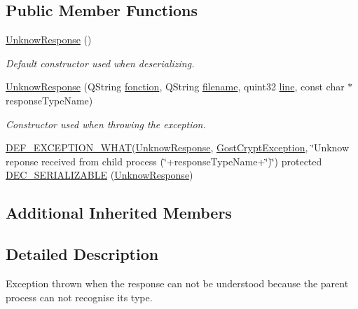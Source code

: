 \subsection*{Public Member Functions}
\begin{DoxyCompactItemize}
\item 
\hyperlink{class_gost_crypt_1_1_core_1_1_unknow_response_a612723cf66cd18947708881e18a1c0ae}{Unknow\+Response} ()
\begin{DoxyCompactList}\small\item\em Default constructor used when deserializing. \end{DoxyCompactList}\item 
\hyperlink{class_gost_crypt_1_1_core_1_1_unknow_response_a1e5f391b0bce671f709a09af6509ff4d}{Unknow\+Response} (Q\+String \hyperlink{class_gost_crypt_1_1_gost_crypt_exception_a29b8c93d5efbb1ff369107385725a939}{fonction}, Q\+String \hyperlink{class_gost_crypt_1_1_gost_crypt_exception_a749a12375f4ba9d502623b99d8252f38}{filename}, quint32 \hyperlink{class_gost_crypt_1_1_gost_crypt_exception_abf506d911f12a4e969eea500f90bd32c}{line}, const char $\ast$response\+Type\+Name)
\begin{DoxyCompactList}\small\item\em Constructor used when throwing the exception. \end{DoxyCompactList}\item 
\hyperlink{_gost_crypt_exception_8h_a5bc1e1c6c9d6f46c84eeba49e33355f9}{D\+E\+F\+\_\+\+E\+X\+C\+E\+P\+T\+I\+O\+N\+\_\+\+W\+H\+AT}(\hyperlink{class_gost_crypt_1_1_core_1_1_unknow_response}{Unknow\+Response}, \hyperlink{class_gost_crypt_1_1_gost_crypt_exception}{Gost\+Crypt\+Exception}, \char`\"{}Unknow reponse received from child process (\char`\"{}+response\+Type\+Name+\char`\"{})\char`\"{}) protected \hyperlink{class_gost_crypt_1_1_core_1_1_unknow_response_a3f17b94045a5ee49f399fe2278fa8742}{D\+E\+C\+\_\+\+S\+E\+R\+I\+A\+L\+I\+Z\+A\+B\+LE} (\hyperlink{class_gost_crypt_1_1_core_1_1_unknow_response}{Unknow\+Response})
\end{DoxyCompactItemize}
\subsection*{Additional Inherited Members}


\subsection{Detailed Description}
Exception thrown when the response can not be understood because the parent process can not recognise its type. 

